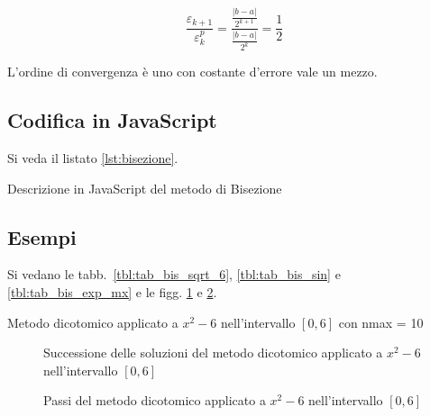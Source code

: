 $$\displaystyle \frac{\varepsilon_{k+1}}{\varepsilon_{k}^p}
=\frac{
    \frac{|b - a|}{2^{k+1}}
  }{
      \frac{|b - a|}{2^k}
  }
  = \frac{1}{2}$$

L'ordine di convergenza è uno con costante d'errore vale un mezzo.

\subsection{Codifica in JavaScript}

Si veda il listato \ref{lst:bisezione}.

\begin{lstfloat}
    
    \caption{Descrizione in JavaScript del metodo di Bisezione}
    \label{lst:bisezione}
\end{lstfloat}

\subsection{Esempi}

Si vedano le tabb.~\ref{tbl:tab_bis_sqrt_6}, \ref{tbl:tab_bis_sin} e \ref{tbl:tab_bis_exp_mx} e le figg. \ref{fig:bis_sqrt_6} e \ref{fig:subplots_bis_sqrt_6}.

\begin{table}[!htbp]
    \begin{center}
\end{center}        
\caption[]{Metodo dicotomico applicato a $x^2 -6$ nell'intervallo $[0, 6]$ con nmax = 10}
\label{tbl:tab_bis_sqrt_6}
\end{table}

\begin{figure}[!htbp]
    \centering
    
    \caption{Successione delle soluzioni del metodo dicotomico applicato a $x^2 -6$ nell'intervallo $[0, 6]$}
    \label{fig:bis_sqrt_6}
\end{figure}

\begin{figure}[!htbp]
    \centering
    
    \caption{Passi del metodo dicotomico applicato a $x^2 -6$ nell'intervallo $[0, 6]$}
    \label{fig:subplots_bis_sqrt_6}
\end{figure}


